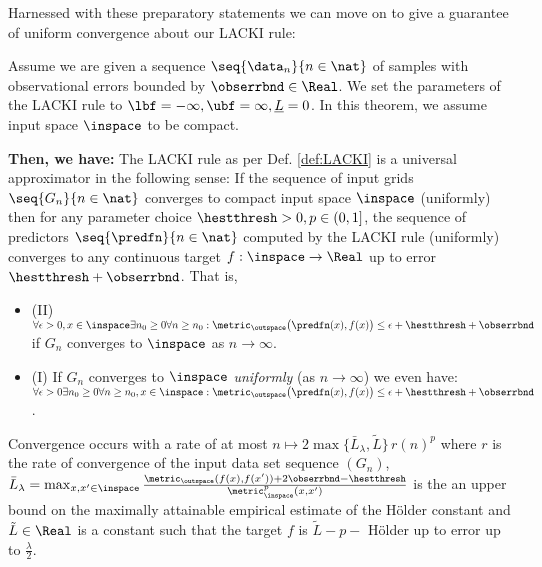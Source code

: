 Harnessed with these preparatory statements we can move on to give a guarantee of uniform convergence about our LACKI rule: 

\begin{thm}
\label{thm:LACKIuniversality}
Assume we are given a sequence $\seq{\data_n}{n \in \nat}$ of samples with observational errors bounded by $\obserrbnd \in \Real$. We set the parameters of the LACKI rule to $\lbf =-\infty,\ubf =\infty, \underline L =0$. In this theorem, we assume input space $\inspace$ to be compact.

\textbf{Then, we have:}
The LACKI rule as per Def. \ref{def:LACKI} is a universal approximator in the following sense:
If the sequence of input grids $\seq{G_n}{n \in \nat}$ converges to compact input space $\inspace$ (uniformly) then for any parameter choice $\hestthresh >0, p \in (0,1]$, the sequence of predictors $\seq{\predfn}{n \in \nat}$ computed by the LACKI rule (uniformly) converges to any continuous target $f : \inspace \to \Real$ up to error $\hestthresh+\obserrbnd$.
That is, 
\begin{itemize}
\item (II) $\forall \epsilon >0,x \in \inspace \exists n_0 \geq 0\forall n\geq n_0: \metric_\outspace\bigl(\predfn(x),f(x)\bigr) \leq \epsilon + \hestthresh+\obserrbnd$ if $G_n$ converges to $\inspace$ as $n \to \infty$.
\item (I) If $G_n$ converges to $\inspace$ \textit{uniformly} (as $n \to \infty$) we even have: $\forall \epsilon >0 \exists n_0 \geq 0\forall n\geq n_0, x \in \inspace: \metric_\outspace\bigl(\predfn(x),f(x)\bigr) \leq \epsilon + \hestthresh +\obserrbnd$. 
\end{itemize}
Convergence occurs with a rate of at most $n \mapsto 2 \max\{\bar L_\lambda, \tilde L \} \,r(n)^p$ where $r$ is the rate of convergence of the input data set sequence $(G_n)$, $\bar L_\lambda =\max_{x,x' \in \inspace} \frac{\metric_\outspace(f(x), f(x')) + 2 \obserrbnd -\hestthresh }{\metric_\inspace^p(x,x')}$ is the an upper bound on the maximally attainable empirical estimate of the H\"older constant and $\tilde L \in \Real$ is a constant such that the target $f$ is $\tilde L-p-$ H\"older up to error up to $\frac \lambda 2$.
\end{thm}

